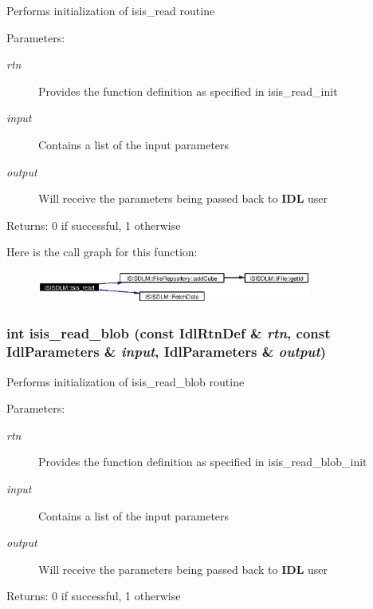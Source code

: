 Performs initialization of isis\_\-read routine \begin{Desc}
\item[Parameters:]
\begin{description}
\item[{\em rtn}]Provides the function definition as specified in isis\_\-read\_\-init \item[{\em input}]Contains a list of the input parameters \item[{\em output}]Will receive the parameters being passed back to {\bf IDL} user \end{description}
\end{Desc}
\begin{Desc}
\item[Returns:]0 if successful, 1 otherwise \end{Desc}


Here is the call graph for this function:\begin{figure}[H]
\begin{center}
\leavevmode
\includegraphics[width=256pt]{namespaceISISDLM_a27_cgraph}
\end{center}
\end{figure}
\subsubsection{\setlength{\rightskip}{0pt plus 5cm}int isis\_\-read\_\-blob (const Idl\-Rtn\-Def \& {\em rtn}, const Idl\-Parameters \& {\em input}, Idl\-Parameters \& {\em output})}\label{namespaceISISDLM_a29}


Performs initialization of isis\_\-read\_\-blob routine \begin{Desc}
\item[Parameters:]
\begin{description}
\item[{\em rtn}]Provides the function definition as specified in isis\_\-read\_\-blob\_\-init \item[{\em input}]Contains a list of the input parameters \item[{\em output}]Will receive the parameters being passed back to {\bf IDL} user \end{description}
\end{Desc}
\begin{Desc}
\item[Returns:]0 if successful, 1 otherwise \end{Desc}


